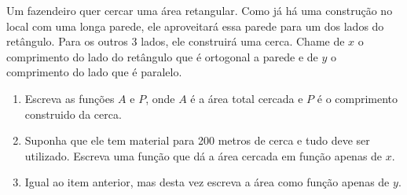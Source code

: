 Um fazendeiro quer cercar uma área retangular.
Como já há uma construção no local com uma longa parede, ele aproveitará essa parede
para um dos lados do retângulo.
Para os outros 3 lados, ele construirá uma cerca.
Chame de $x$ o comprimento do lado do retângulo que é ortogonal a parede e de $y$ o comprimento 
do lado que é paralelo.

\begin{enumerate}
	\item Escreva as funções $A$ e $P$, onde $A$ é a área total cercada e $P$ é o comprimento construido da cerca.
	\item Suponha que ele tem material para 200 metros de cerca e tudo deve ser utilizado.
	Escreva uma função que dá a área cercada em função apenas de $x$.
	\item Igual ao item anterior, mas desta vez escreva a área como função apenas de $y$.
\end{enumerate}
